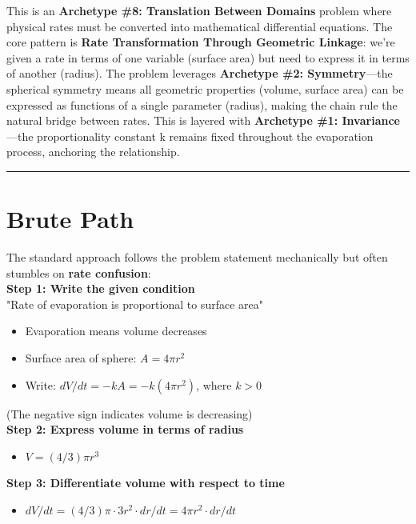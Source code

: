 \documentclass{article}
\begin{document}
This is an \textbf{Archetype \#8: Translation Between Domains} problem where physical rates must be converted into mathematical differential equations. The core pattern is \textbf{Rate Transformation Through Geometric Linkage}: we're given a rate in terms of one variable (surface area) but need to express it in terms of another (radius). The problem leverages \textbf{Archetype \#2: Symmetry}—the spherical symmetry means all geometric properties (volume, surface area) can be expressed as functions of a single parameter (radius), making the chain rule the natural bridge between rates. This is layered with \textbf{Archetype \#1: Invariance}—the proportionality constant k remains fixed throughout the evaporation process, anchoring the relationship.

\noindent \rule{\textwidth}{0.4pt}

\section*{Brute Path}

The standard approach follows the problem statement mechanically but often stumbles on \textbf{rate confusion}: \\

\noindent \textbf{Step 1: Write the given condition} \\
"Rate of evaporation is proportional to surface area"
\begin{itemize}
    \item Evaporation means volume decreases
    \item Surface area of sphere: $A = 4\pi r^2$
    \item Write: $dV/dt = -kA = -k(4\pi r^2)$, where $k > 0$
\end{itemize}
(The negative sign indicates volume is decreasing) \\

\noindent \textbf{Step 2: Express volume in terms of radius}
\begin{itemize}
    \item $V = (4/3)\pi r^3$
\end{itemize}

\noindent \textbf{Step 3: Differentiate volume with respect to time}
\begin{itemize}
    \item $dV/dt = (4/3)\pi \cdot 3r^2 \cdot dr/dt = 4\pi r^2 \cdot dr/dt$
\end{itemize}
\end{document}
